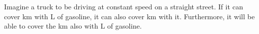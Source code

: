 \devel{
\begin{forslides}
  \begin{equation*}
    \label{eq:dpi_to_dp_1}
    \tup{\fun^*,\res}\mapsto \exists \imp \in \impsp \colon (\fun \posleq_\funsp \prov(\imp)) \wedge (\req(\imp)\posleq_\ressp \res)
\end{equation*}

    \begin{equation*}
    \label{eq:dpi_to_dp_2}
    \tup{\fun^*,\res}\mapsto \{ \imp \in \impsp \colon (\fun \posleq_\funsp \prov(\imp)) \wedge (\req(\imp)\posleq_\ressp \res)\}
\end{equation*}
\end{forslides}
}





\begin{example}
  Imagine a truck to be driving at constant speed on a straight street.
  If it can cover \unit[100]{km} with \unit[10]{L} of gasoline, it can also cover \unit[80]{km} with it.
  Furthermore, it will be able to cover the \unit[100]{km} also with \unit[10]{L} of gasoline.
\end{example}
%


